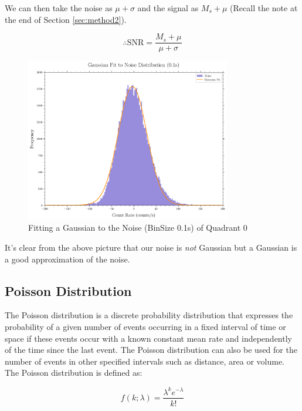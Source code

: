 \documentclass[11pt]{book} %
\begin{document}
We can then take the noise as $\mu+\sigma$ and the signal as $M_s+\mu$ (Recall the note at the end of Section \ref{sec:method2}).

\begin{equation}
    \therefore \text{SNR} = \frac{M_s+\mu}{\mu+\sigma}
\end{equation}

\begin{figure}[H]
    \centering
    \includegraphics[width=0.8\textwidth]{Pictures/gaussian_fit.png}
    \caption{Fitting a Gaussian to the Noise (BinSize 0.1s) of Quadrant 0}
\end{figure}

It's clear from the above picture that our noise is \textit{not} Gaussian but a Gaussian is a good approximation of the noise.


\subsection{Poisson Distribution}

The Poisson distribution is a discrete probability distribution that expresses the probability of a given number of events occurring in a fixed interval of time or space if these events occur with a known constant mean rate and independently of the time since the last event. The Poisson distribution can also be used for the number of events in other specified intervals such as distance, area or volume. The Poisson distribution is defined as:

\begin{equation} \label{eq:Poisson}
    f(k; \lambda)=\frac{\lambda^k e^{-\lambda}}{k!}
\end{equation}
    
\end{document}
